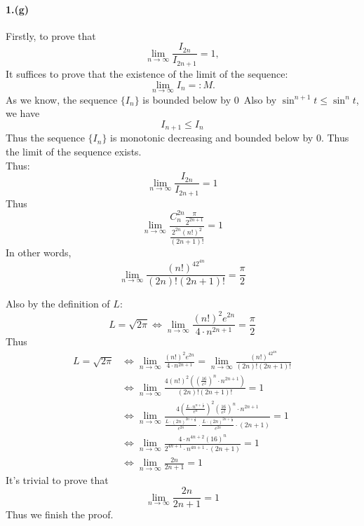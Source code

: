 \documentclass{article}
\begin{document}
\paragraph[short]{1.(g)}
{
Firstly, to prove that
$$\lim_{n\to\infty}\frac{I_{2n}}{I_{2n+1}}=1,$$
It suffices to prove that the existence of the limit of the sequence:
$$\lim_{n\to\infty}I_n=:M.$$
As we know, the sequence $\{I_n\}$ is bounded below by $0$\
Also by $\sin^{n+1} t\leq \sin^{n}t$, we have
$$I_{n+1}\leq I_{n}$$
Thus the sequence $\{I_n\}$ is monotonic decreasing and bounded below by $0$.
Thus the limit of the sequence exists.\\
Thus:
$$\lim_{n\to\infty}\frac{I_{2n}}{I_{2n+1}}=1$$
Thus 
$$\lim_{n\to\infty}\frac{C^{2n}_n\frac{\pi}{2^{2n+1}}}{\frac{2^{2n}(n!)^2}{(2n+1)!}}=1$$
In other words,
$$\lim_{n\to\infty}\frac{(n!)^42^{4n}}{(2n)!(2n+1)!}=\frac{\pi}{2}$$

Also by the definition of $L$:
$$L=\sqrt{2\pi}\iff \lim_{n\to\infty}\frac{(n!)^2e^{2n}}{4\cdot n^{2n+1}}=\frac{\pi}{2}$$
Thus
\begin{align*}
L=\sqrt{2\pi}&\iff \lim_{n\to\infty}\frac{(n!)^2e^{2n}}{4\cdot n^{2n+1}}=\lim_{n\to\infty}\frac{(n!)^42^{4n}}{(2n)!(2n+1)!}\\
&\iff \lim_{n\to\infty}\frac{4(n!)^2((\frac{16}{e^2})^n\cdot n^{2n+1})}{(2n)!(2n+1)!}=1\\
&\iff \lim_{n\to\infty}\frac{
    4(\frac{L\cdot n^{n+\frac{1}{2}}}{e^n})^2(\frac{16}{e^2})^n\cdot n^{2n+1}
}{
    \frac{L\cdot(2n)^{2n+\frac{1}{2}}}{e^{2n}}\cdot\frac{L\cdot(2n)^{2n+\frac{1}{2}}}{e^{2n}}\cdot(2n+1)
}=1\\
&\iff \lim_{n\to\infty}\frac{
    4\cdot n^{4n+2}(16)^n
}{
    2^{4n+1}\cdot n^{4n+1}\cdot(2n+1)
}=1\\
&\iff \lim_{n\to\infty}\frac{2n}{2n+1}=1
\end{align*}
It's trivial to prove that
$$\lim_{n\to\infty}\frac{2n}{2n+1}=1$$
Thus we finish the proof.
}



 
\end{document}
